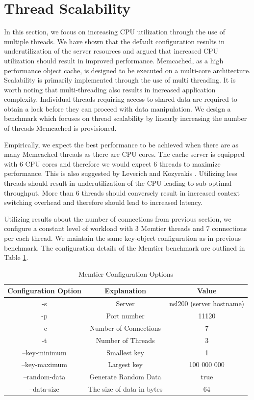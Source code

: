 
\section{Thread Scalability}
In this section, we focus on increasing CPU utilization through the use of multiple threads. We have shown that the default configuration results in underutilization of the server resources and argued that increased CPU utilization should result in improved performance. Memcached, as a high performance object cache, is designed to be executed on a multi-core architecture. Scalability is primarily implemented through the use of multi threading. It is worth noting that multi-threading also results in increased application complexity. Individual threads requiring access to shared data are required to obtain a lock before they can proceed with data manipulation. We design a benchmark which focuses on thread scalability by linearly increasing the number of threads Memcached is provisioned.

Empirically, we expect the best performance to be achieved when there are as many Memcached threads as there are CPU cores. The cache server is equipped with 6 CPU cores and therefore we would expect 6 threads to maximize performance. This is also suggested by Leverich and Kozyrakis \cite{leverich2014reconciling}. Utilizing less threads should result in underutilization of the CPU leading to sub-optimal throughput. More than 6 threads should conversely result in increased context switching overhead and therefore should lead to increased latency.

Utilizing results about the number of connections from previous section, we configure a constant level of workload with 3 Memtier threads and 7 connections per each thread. We maintain the same key-object configuration as in previous benchmark. The configuration details of the Memtier benchmark are outlined in Table \ref{tab:m_threads_memtier}.

\begin{table}[h!]
\centering
\begin{tabular}{| c c c |}
 \hline
 Configuration Option & Explanation & Value\\ [0.5ex]
 \hline\hline

 -s & Server & nsl200 (server hostname) \\
 -p & Port number & 11120 \\
 -c & Number of Connections & 7 \\
 -t & Number of Threads & 3 \\
 --key-minimum & Smallest key & 1 \\
 --key-maximum & Largest key & 100 000 000 \\
 --random-data & Generate Random Data & true \\
 --data-size & The size of data in bytes & 64 \\

 \hline

\end{tabular}
\caption{Memtier Configuration Options}
\label{tab:m_threads_memtier}
\end{table}

